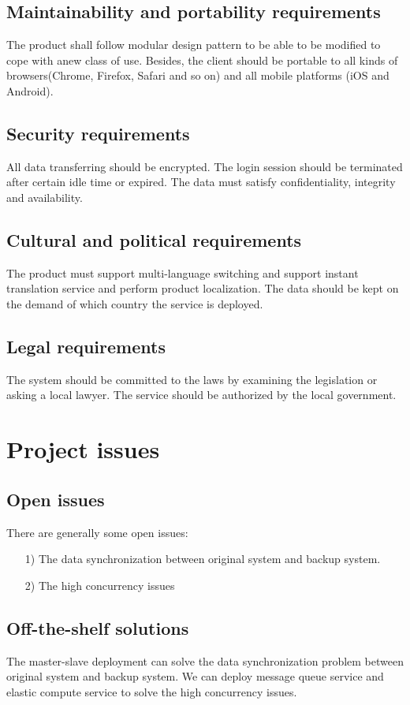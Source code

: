 \documentclass{scrreprt}
\begin{document}
\section{Maintainability and portability requirements}
The product shall follow modular design pattern to be able to be modified to cope with anew class of use. Besides, the client should be portable to all kinds of browsers(Chrome, Firefox, Safari and so on) and all mobile platforms (iOS and Android).
\section{Security requirements}
All data transferring should be encrypted. The login session should be terminated after certain idle time or expired. The data must satisfy confidentiality, integrity and availability.
\section{Cultural and political requirements}
The product must support multi-language switching and support instant translation service and perform product localization. The data should be kept on the demand of which country the service is deployed.
\section{Legal requirements}
The system should be committed to the laws by examining the legislation or asking a local lawyer. The service should be authorized by the local government.

\chapter{Project issues}
\section{Open issues}
There are generally some open issues:
\begin{enumerate}
    \item [1)] The data synchronization between original system and backup system.
    \item [2)] The high concurrency issues

\end{enumerate}
\section{Off-the-shelf solutions}
The master-slave deployment can solve the data synchronization problem between original system and backup system. We can deploy message queue service and elastic compute service to solve the high concurrency issues.
\end{document}
